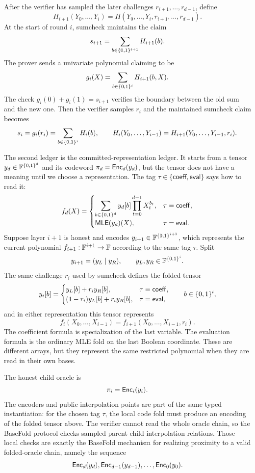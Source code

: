 After the verifier has sampled the later challenges
$r_{i+1},\ldots,r_{d-1}$, define
\[
  H_{i+1}(Y_0,\ldots,Y_i)
  =
  H(Y_0,\ldots,Y_i,r_{i+1},\ldots,r_{d-1}).
\]
At the start of round $i$, sumcheck maintains the claim
\[
  s_{i+1}
  =
  \sum_{b\in\{0,1\}^{i+1}}H_{i+1}(b).
\]
The prover sends a univariate polynomial claiming to be
\[
  g_i(X)=\sum_{b\in\{0,1\}^i}H_{i+1}(b,X).
\]
The check $g_i(0)+g_i(1)=s_{i+1}$ verifies the boundary between the old sum and
the new one.  Then the verifier samples $r_i$ and the maintained sumcheck claim
becomes
\[
  s_i=g_i(r_i)
  =
  \sum_{b\in\{0,1\}^i}H_i(b),
  \qquad
  H_i(Y_0,\ldots,Y_{i-1})
  =
  H_{i+1}(Y_0,\ldots,Y_{i-1},r_i).
\]

The second ledger is the committed-representation ledger.  It starts from a
tensor $y_d\in\mathbb{F}^{\{0,1\}^d}$ and its codeword $\pi_d=\mathsf{Enc}_d(y_d)$, but the tensor
does not have a meaning until we choose a representation.  The tag
$\tau\in\{\mathsf{coeff},\mathsf{eval}\}$ says how to read it:
\[
  f_d(X)=
  \begin{cases}
    \displaystyle\sum_{b\in\{0,1\}^d}y_d[b]\prod_{t=0}^{d-1}X_t^{b_t},
      & \tau=\mathsf{coeff},\\[0.9em]
    \mathsf{MLE}(y_d)(X),
      & \tau=\mathsf{eval}.
  \end{cases}
\]
Suppose layer $i+1$ is honest and encodes
$y_{i+1}\in\mathbb{F}^{\{0,1\}^{i+1}}$, which represents the current polynomial
$f_{i+1}:\mathbb{F}^{i+1}\to\mathbb{F}$ according to the same tag $\tau$.  Split
\[
  y_{i+1}=(y_L\mid y_R),
  \qquad y_L,y_R\in\mathbb{F}^{\{0,1\}^i}.
\]
The same challenge $r_i$ used by sumcheck defines the folded tensor
\[
  y_i[b]=
  \begin{cases}
    y_L[b]+r_i y_R[b],
      & \tau=\mathsf{coeff},\\
    (1-r_i)y_L[b]+r_i y_R[b],
      & \tau=\mathsf{eval},
  \end{cases}
  \qquad b\in\{0,1\}^i,
\]
and in either representation this tensor represents
\[
  f_i(X_0,\ldots,X_{i-1})
  =
  f_{i+1}(X_0,\ldots,X_{i-1},r_i).
\]
The coefficient formula is specialization of the last variable.  The
evaluation formula is the ordinary MLE fold on the last Boolean coordinate.
These are different arrays, but they represent the same restricted polynomial
when they are read in their own bases.

The honest child oracle is
\[
  \pi_i=\mathsf{Enc}_i(y_i).
\]
The encoders and public interpolation points are part of the same typed
instantiation: for the chosen tag $\tau$, the local code fold must produce an
encoding of the folded tensor above.  The verifier cannot read the whole oracle
chain, so the BaseFold protocol checks sampled parent-child interpolation
relations.  Those local checks are exactly the BaseFold mechanism for realizing
proximity to a valid folded-oracle chain, namely the sequence
\[
  \mathsf{Enc}_d(y_d),\mathsf{Enc}_{d-1}(y_{d-1}),\ldots,\mathsf{Enc}_0(y_0).
\]

